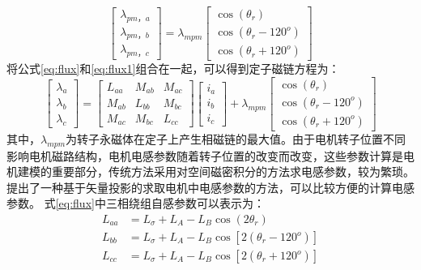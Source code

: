 \begin{equation}\label{eq:flux1}
\begin{bmatrix}\lambda_{pm，a}\\\lambda_{pm，b}\\\lambda_{pm，c}\end{bmatrix}
=
\lambda_{mpm}\begin{bmatrix}\cos(\theta_{r})\\\cos(\theta_{r}-120^{o})\\\cos(\theta_{r}+120^{o})\end{bmatrix} 
\end{equation}
将公式\ref{eq:flux}和\ref{eq:flux1}组合在一起，可以得到定子磁链方程为：
\begin{equation}\label{eq:flux2}
\begin{bmatrix}
\lambda_{a}\\\lambda_{b}\\\lambda_{c}
\end{bmatrix}
=
\begin{bmatrix}
L_{aa}&M_{ab}&M_{ac}\\M_{ab}&L_{bb}&M_{bc}\\M_{ac}&M_{bc}&L_{cc}
\end{bmatrix}
\begin{bmatrix}
i_{a}\\i_{b}\\i_{c}
\end{bmatrix}
+
\lambda_{mpm}\begin{bmatrix}\cos(\theta_{r})\\\cos(\theta_{r}-120^{o})\\\cos(\theta_{r}+120^{o})\end{bmatrix}
\end{equation}
其中，$\lambda_{mpm}$为转子永磁体在定子上产生相磁链的最大值。由于电机转子位置不同影响电机磁路结构，电机电感参数随着转子位置的改变而改变，这些参数计算是电机建模的重要部分，传统方法采用对空间磁密积分的方法\cite{krause2013analysis}求电感参数，较为繁琐。\cite{lu2011simple}提出了一种基于矢量投影的求取电机中电感参数的方法，可以比较方便的计算电感参数。
式\ref{eq:flux}中三相绕组自感参数可以表示为：
\begin{align}
L_{aa}&= L_{\sigma}+L_{A}-L_{B}\cos(2\theta_{r})\label{eq:Laa}\\
L_{bb}&= L_{\sigma}+L_{A}-L_{B}\cos[2(\theta_{r}-120^{o})]\label{eq:Lbb}\\ 
L_{cc}&= L_{\sigma}+L_{A}-L_{B}\cos[2(\theta_{r}+120^{o})]\label{eq:Lcc}
\end{align}
